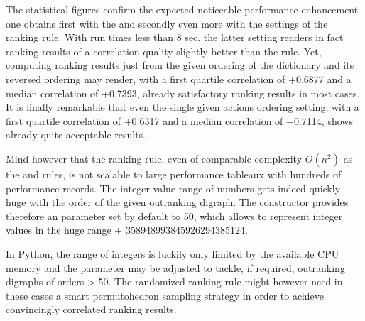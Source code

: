 \documentclass[a4paper,12pt,english]{sphinxhowto}
\begin{document}
\sphinxAtStartPar
The statistical figures confirm the expected noticeable performance enhancement one obtains first with the  and secondly even more with the  settings of the  ranking rule. With run times less than 8 sec. the latter setting renders in fact ranking results of a correlation quality slightly better than the  rule. Yet, computing ranking results just from the given ordering of the  dictionary and its reversed ordering may render, with a first quartile correlation of +0.6877 and a median correlation of +0.7393, already satisfactory ranking results in most cases. It is finally remarkable that even the single given actions ordering setting, with a first quartile correlation of +0.6317 and a median correlation of +0.7114, shows already quite acceptable results.

\sphinxAtStartPar
Mind however that the  ranking rule, even of comparable complexity \(O(n^2)\) as the  and  rules, is not scalable to large performance tableaux with hundreds of performance records. The integer value range of  numbers gets indeed quickly huge with the order of the given outranking digraph. The  constructor provides therefore an  parameter set by default to 50, which allows to represent integer values in the huge range +\sphinxhyphen{} 358948993845926294385124.

\begin{sphinxVerbatim}[commandchars=\\\{\},numbers=left,firstnumber=1,stepnumber=1]
 
  \PYG{p}{[}    \PYG{p}{]}
  
\end{sphinxVerbatim}

\sphinxAtStartPar
In Python, the range of integers is luckily only limited by the available CPU memory and the  parameter may be adjusted to tackle, if required, outranking digraphs of orders \textgreater{} 50. The randomized  ranking rule might however need in these cases a smart permutohedron sampling strategy in order to achieve convincingly correlated ranking results.
\end{document}
